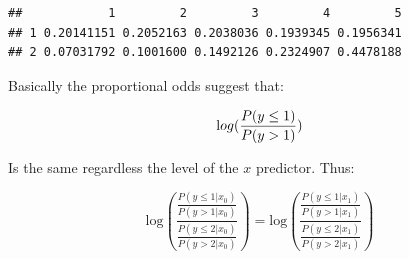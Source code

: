\documentclass[
  man,floatsintext]{apa6}
\newenvironment{Shaded}{\begin{snugshade}}{\end{snugshade}}
\newcommand{\AttributeTok}[1]{\textcolor[rgb]{0.13,0.29,0.53}{#1}}
\newcommand{\CommentTok}[1]{\textcolor[rgb]{0.56,0.35,0.01}{\textit{#1}}}
\newcommand{\DecValTok}[1]{\textcolor[rgb]{0.00,0.00,0.81}{#1}}
\newcommand{\FloatTok}[1]{\textcolor[rgb]{0.00,0.00,0.81}{#1}}
\newcommand{\FunctionTok}[1]{\textcolor[rgb]{0.13,0.29,0.53}{\textbf{#1}}}
\newcommand{\NormalTok}[1]{#1}
\newcommand{\OtherTok}[1]{\textcolor[rgb]{0.56,0.35,0.01}{#1}}
\newcommand{\SpecialCharTok}[1]{\textcolor[rgb]{0.81,0.36,0.00}{\textbf{#1}}}
\newcommand{\StringTok}[1]{\textcolor[rgb]{0.31,0.60,0.02}{#1}}
\begin{document}
\begin{Shaded}
\end{Shaded}

\begin{verbatim}
##            1         2         3         4         5
## 1 0.20141151 0.2052163 0.2038036 0.1939345 0.1956341
## 2 0.07031792 0.1001600 0.1492126 0.2324907 0.4478188
\end{verbatim}

\normalsize
Basically the proportional odds suggest that:

\[
\text log(\frac{P(y \leq 1)}{P(y > 1)})
\]

Is the same regardless the level of the \(x\) predictor. Thus:

\[
\text{log}\left(\frac{\frac{P(y \leq 1|x_0)}{P(y > 1|x_0)}}{\frac{P(y \leq 2|x_0)}{P(y > 2|x_0)}}\right) = \text{log}\left(\frac{\frac{P(y \leq 1|x_1)}{P(y > 1|x_1)}}{\frac{P(y \leq 2|x_1)}{P(y > 2|x_1)}}\right)
\]
\end{document}
